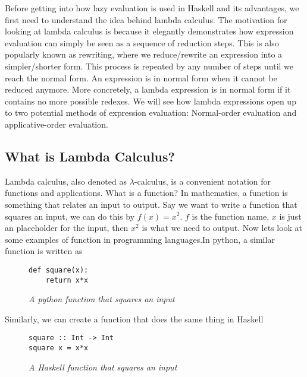 \documentclass{article}
\begin{document}
Before getting into how lazy evaluation is used in Haskell and its advantages, we first need to understand the idea behind lambda calculus. The motivation for looking at lambda calculus is because it elegantly demonstrates how expression evaluation can simply be seen as a sequence of reduction steps. This is also popularly known as rewriting, where we reduce/rewrite an expression into a simpler/shorter form. This process is repeated by any number of steps until we reach the normal form. An expression is in normal form when it cannot be reduced anymore. More concretely, a lambda expression is in normal form if it contains no more possible redexes. We will see how lambda expressions open up to two potential methods of expression evaluation: Normal-order evaluation and applicative-order evaluation.

\subsection{What is Lambda Calculus?}
Lambda calculus, also denoted as $\lambda$-calculus, is a convenient notation for functions and applications. What is a function? In mathematics, a function is something that relates an input to output. Say we want to write a function that squares an input, we can do this by $f(x) = {x}^2$. $f$ is the function name, $x$ is just an placeholder for the input, then ${x}^2$ is what we need to output. Now lets look at some examples of function in programming languages.In python, a similar function is written as
\begin{figure}[!htb]
    \begin{lstlisting}
def square(x):
    return x*x
    \end{lstlisting}
    \caption{\textit{A python function that squares an input}}
\end{figure}

\medskip\noindent
Similarly, we can create a function that does the same thing in Haskell

\begin{figure}[H]
    \begin{lstlisting}
square :: Int -> Int
square x = x*x
    \end{lstlisting}
    \caption{\textit{A Haskell function that squares an input}}
\end{figure}
\end{document}
